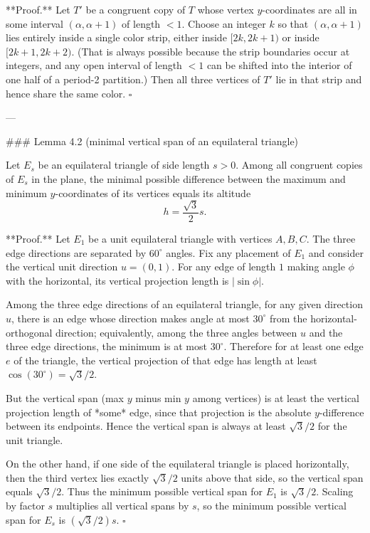 **Proof.**
Let $T'$ be a congruent copy of $T$ whose vertex $y$-coordinates are all in some interval $(\alpha,\alpha+1)$ of length $<1$.
Choose an integer $k$ so that $(\alpha,\alpha+1)$ lies entirely inside a single color strip, either inside $[2k,2k+1)$ or inside $[2k+1,2k+2)$.
(That is always possible because the strip boundaries occur at integers, and any open interval of length $<1$ can be shifted into the interior of one half of a period-2 partition.)
Then all three vertices of $T'$ lie in that strip and hence share the same color.
$\square$

---

### Lemma 4.2 (minimal vertical span of an equilateral triangle)

Let $E_s$ be an equilateral triangle of side length $s>0$.
Among all congruent copies of $E_s$ in the plane, the minimal possible difference between the maximum and minimum $y$-coordinates of its vertices equals its altitude
\[
h=\frac{\sqrt3}{2}s.
\]

**Proof.**
Let $E_1$ be a unit equilateral triangle with vertices $A,B,C$.
The three edge directions are separated by $60^\circ$ angles.
Fix any placement of $E_1$ and consider the vertical unit direction $u=(0,1)$.
For any edge of length $1$ making angle $\phi$ with the horizontal, its vertical projection length is $|\sin\phi|$.

Among the three edge directions of an equilateral triangle, for any given direction $u$, there is an edge whose direction makes angle at most $30^\circ$ from the horizontal-orthogonal direction; equivalently, among the three angles between $u$ and the three edge directions, the minimum is at most $30^\circ$.
Therefore for at least one edge $e$ of the triangle, the vertical projection of that edge has length at least $\cos(30^\circ)=\sqrt3/2$.

But the vertical span (max $y$ minus min $y$ among vertices) is at least the vertical projection length of *some* edge, since that projection is the absolute $y$-difference between its endpoints. Hence the vertical span is always at least $\sqrt3/2$ for the unit triangle.

On the other hand, if one side of the equilateral triangle is placed horizontally, then the third vertex lies exactly $\sqrt3/2$ units above that side, so the vertical span equals $\sqrt3/2$.
Thus the minimum possible vertical span for $E_1$ is $\sqrt3/2$.
Scaling by factor $s$ multiplies all vertical spans by $s$, so the minimum possible vertical span for $E_s$ is $(\sqrt3/2)s$.
$\square$

